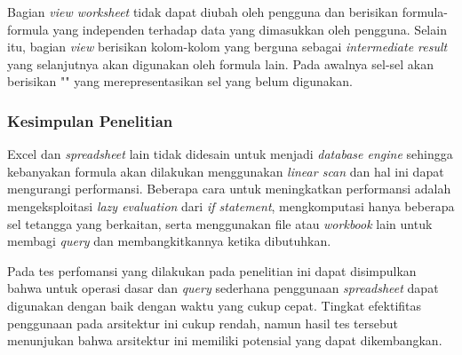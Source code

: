     Bagian \textit{view worksheet} tidak dapat diubah oleh pengguna dan berisikan formula-formula yang independen terhadap data yang dimasukkan oleh pengguna. Selain itu, bagian \textit{view} berisikan kolom-kolom yang berguna sebagai \textit{intermediate result} yang selanjutnya akan digunakan oleh formula lain. Pada awalnya sel-sel akan berisikan "" yang merepresentasikan sel yang belum digunakan.

    \subsubsection{Kesimpulan Penelitian}

    Excel dan \textit{spreadsheet} lain tidak didesain untuk menjadi \textit{database engine} sehingga kebanyakan formula akan dilakukan menggunakan \textit{linear scan} dan hal ini dapat mengurangi performansi. Beberapa cara untuk meningkatkan performansi adalah mengeksploitasi \textit{lazy evaluation} dari \textit{if statement}, mengkomputasi hanya beberapa sel tetangga yang berkaitan, serta menggunakan file atau \textit{workbook} lain untuk membagi \textit{query} dan membangkitkannya ketika dibutuhkan.

    Pada tes perfomansi yang dilakukan pada penelitian ini dapat disimpulkan bahwa untuk operasi dasar dan \textit{query} sederhana penggunaan \textit{spreadsheet} dapat digunakan dengan baik dengan waktu yang cukup cepat. Tingkat efektifitas penggunaan pada arsitektur ini cukup rendah, namun hasil tes tersebut menunjukan bahwa arsitektur ini memiliki potensial yang dapat dikembangkan.